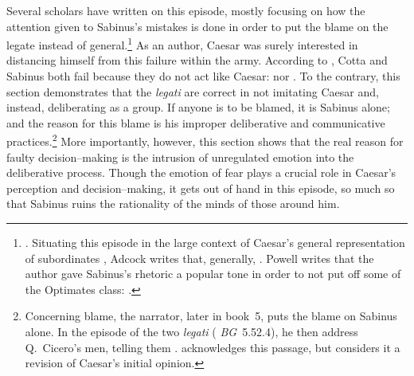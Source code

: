\documentclass[12pt,letterpaper,oneside,final]{memoir}
\begin{document}
Several scholars have written on this episode, mostly focusing on how the attention given to Sabinus's mistakes is done in order to put the blame on the legate instead of general.\footnote{ \parencite[300]{goldsworthy2006}. Situating this episode in the large context of Caesar's general representation of subordinates \parencite[73--76]{adcock1956}, Adcock writes that, generally, . Powell writes that the author gave Sabinus's rhetoric a popular tone in order to not put off some of the Optimates class:  \parencite[118--119]{powell1998}.} As an author, Caesar was surely interested in distancing himself from this failure within the army. According to \textcite{riggsby2006}, Cotta and Sabinus both fail because they do not act like Caesar:  nor . To the contrary, this section demonstrates that the \emph{legati} are correct in not imitating Caesar and, instead, deliberating as a group. If anyone is to be blamed, it is Sabinus alone; and the reason for this blame is his improper deliberative and communicative practices.\footnote{Concerning blame, the narrator, later in book~5, puts the blame on Sabinus alone. In the episode of the two \emph{legati} ( \emph{BG}~5.52.4), he then address Q.~Cicero's men, telling them . \textcite[p.~235, n.~53]{riggsby2006} acknowledges this passage, but considers it a revision of Caesar's initial opinion.} More importantly, however, this section shows that the real reason for faulty decision--making is the intrusion of unregulated emotion into the deliberative process. Though the emotion of fear plays a crucial role in Caesar's perception and decision--making, it gets out of hand in this episode, so much so that Sabinus ruins the rationality of the minds of those around him.
\end{document}
